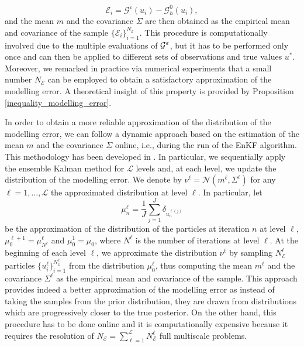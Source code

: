 \documentclass[10pt]{article}
\begin{document}
\[ \mathcal{E}_i = \mathcal{G}^{\varepsilon}(u_i) - \mathcal{G}^0_h(u_i), \]
and the mean $m$ and the covariance $\Sigma$ are then obtained as the empirical mean and covariance of the sample $\{\mathcal E_i\}_{i=1}^{N_{\mathcal E}}$. This procedure is computationally involved due to the multiple evaluations of $\mathcal G^\varepsilon$, but it has to be performed only once and can then be applied to different sets of observations and true values $u^*$. Moreover, we remarked in practice via numerical experiments that a small number $N_{\mathcal E}$ can be employed to obtain a satisfactory approximation of the modelling error. A theoretical insight of this property is provided by Proposition \ref{inequality_modelling_error}.

In order to obtain a more reliable approximation of the distribution of the modelling error, we can follow a dynamic approach based on the estimation of the mean $m$ and the covariance $\Sigma$ online, i.e., during the run of the EnKF algorithm. This methodology has been developed in \cite{CDS18}. In particular, we sequentially apply the ensemble Kalman method for $\mathcal{L}$ levels and, at each level, we update the distribution of the modelling error. We denote by $\nu^{\ell} = \mathcal{N}(m^{\ell}, \Sigma^{\ell})$ for any $\ell = 1, \dots, \mathcal{L}$ the approximated distribution at level $\ell$. In particular, let
\[ \mu_n^{\ell} = \frac{1}{J} \sum_{j=1}^J \delta_{u^{\ell (j)}_n} \]
be the approximation of the distribution of the particles at iteration $n$ at level $\ell$, $\mu_0^{\ell + 1} = \mu_{N^{\ell}}^{\ell}$ and $\mu_0^1 = \mu_0$, where $N^{\ell}$ is the number of iterations at level $\ell$. At the beginning of each level $\ell$, we approximate the distribution $\nu^{\ell}$ by sampling $N_{\mathcal{E}}^{\ell}$ particles $\{ u_i^{\ell} \}_{i=1}^{N_{\mathcal{E}}^{\ell}}$ from the distribution $\mu_0^{\ell}$, thus  computing the mean $m^{\ell}$ and the covariance $\Sigma^{\ell}$ as the empirical mean and covariance of the sample. This approach provides indeed a better approximation of the modelling error as instead of taking the samples from the prior distribution, they are drawn from distributions which are progressively closer to the true posterior. On the other hand, this procedure has to be done online and it is computationally expensive because it requires the resolution of $N_{\mathcal{E}} = \sum_{\ell=1}^{\mathcal{L}} N_{\mathcal{E}}^{\ell}$ full multiscale problems.
\end{document}
